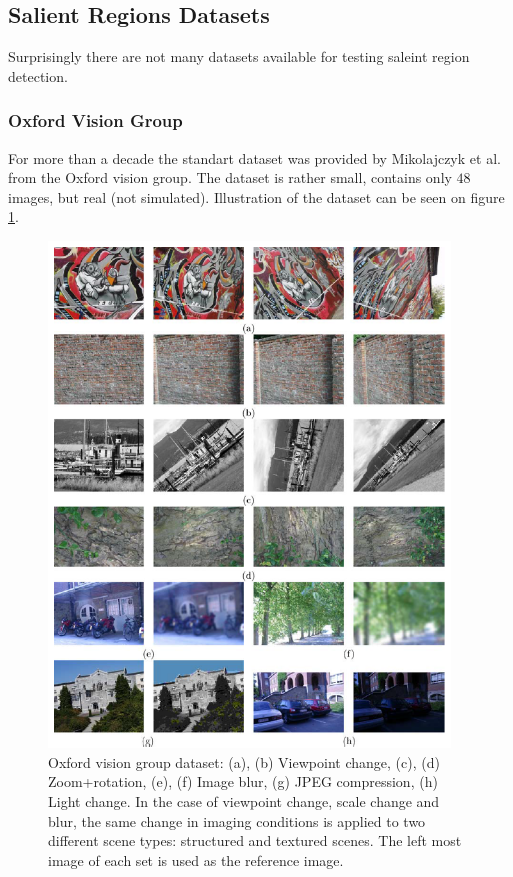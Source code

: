 \subsection{Salient Regions Datasets} \label{sec:salregdb}
Surprisingly there are not many datasets available for testing saleint region detection.

\subsubsection{Oxford Vision Group}

For more than a decade the standart dataset was provided by Mikolajczyk et al. \cite{Mikolajczyk:2005} from the Oxford vision group. The dataset is rather small, contains only $48$ images, but real (not simulated). Illustration of the dataset can be seen on figure \ref{fig:mikdataset}. 

\begin{figure}[H]
\begin{center}
\includegraphics[width=0.95\textwidth]{fig/MikDataset}
\end{center}
\caption{Oxford vision group dataset: (a), (b) Viewpoint change, (c), (d) Zoom+rotation, (e), (f) Image blur, (g) JPEG compression, (h) Light change. In the
case of viewpoint change, scale change and blur, the same change in imaging conditions is applied to two different scene types: structured and
textured scenes. The left most image of each set is used as the reference image.}
\label{fig:mikdataset}
\end{figure}

